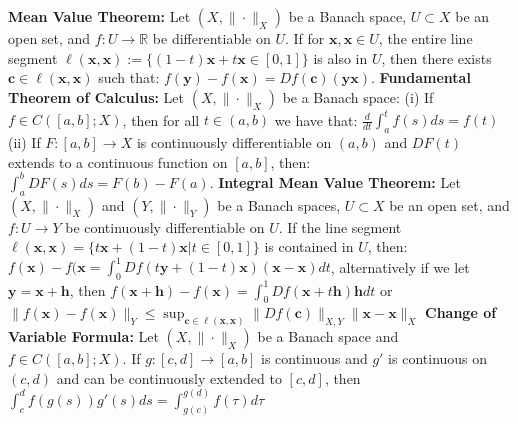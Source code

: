 \documentclass{article}
\theoremstyle{definition}
\begin{document}
{\textbf{Mean Value Theorem:} Let $(X, \| \cdot \| _X)$ be a Banach space, $U \subset X$ be an open set, and $f:U \rightarrow \mathbb{R}$ be differentiable on $U$. If for $\textbf{x}, \textbf{x} \in U$, the entire line segment $\ell(\textbf{x}, \textbf{x}) := \{(1-t)\textbf{x} + t \textbf{x} \in [0,1]\}$ is also in $U$, then there exists $\textbf{c}\in \ell(\textbf{x}, \textbf{x})$ such that: $f(\textbf{y}) - f(\textbf{x}) = Df(\textbf{c})(\textbf{y} \textbf{x})$. 
\textbf{Fundamental Theorem of Calculus:} Let $(X, \| \cdot \| _X)$ be a Banach space: (i) If $f\in C([a,b];X)$, then for all $t \in (a,b)$ we have that: $\frac{d}{dt} \int_a^t f(s)ds = f(t)$ (ii) If $F:[a,b] \rightarrow X$ is continuously differentiable on $(a,b)$ and $DF(t)$ extends to a continuous function on $[a,b]$, then: $\int_a^b DF(s)ds = F(b) - F(a)$. 
\textbf{Integral Mean Value Theorem:} Let $(X, \| \cdot \| _X)$ and $(Y, \| \cdot \| _Y)$ be a Banach spaces, $U \subset X$ be an open set, and $f:U \rightarrow Y$ be continuously differentiable on $U$. If the line segment $\ell(\textbf{x}, \textbf{x}) = \{t \textbf{x} + (1-t) \textbf{x} | t \in [0,1] \}$ is contained in $U$, then: $f(\textbf{x}) - f(\textbf{x} = \int_0^1 Df(t \textbf{y} + (1-t)\textbf{x}) (\textbf{x} - \textbf{x})dt$, alternatively if we let $\textbf{y} = \textbf{x} + \textbf{h}$, then $f(\textbf{x} + \textbf{h}) - f(\textbf{x}) = \int^1_0 Df(\textbf{x} + t \textbf{h}) \textbf{h} dt$ or $\| f(\textbf{x}) - f(\textbf{x}) \|_Y \leq \sup_{\textbf{c}\in \ell(\textbf{x}, \textbf{x})} \| Df(\textbf{c}) \|_{X,Y} \| \textbf{x} - \textbf{x} \|_X $ 
\textbf{Change of Variable Formula:} Let $(X, \| \cdot \| _X)$ be a Banach space and $f\in C([a,b];X)$. If $g:[c,d] \rightarrow [a,b]$ is continuous and $g'$ is continuous on $(c,d)$ and can be continuously extended to $[c,d]$, then $\int_c^d f(g(s))g'(s)ds = \int_{g(c)}^{g(d)} f(\tau) d\tau$

}
\end{document}
